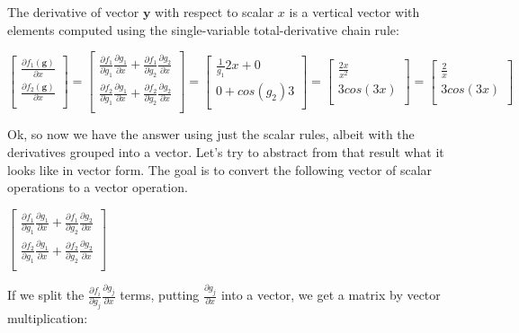 \documentclass[11pt]{article}
\begin{document}
The derivative of vector $\mathbf{y}$ with respect to scalar $x$ is a vertical vector with elements computed using the single-variable total-derivative chain rule:

$
\begin{bmatrix}
	\frac{\partial f_1(\mathbf{g})}{\partial x}\\
	\frac{\partial f_2(\mathbf{g})}{\partial x}\\
\end{bmatrix} = \begin{bmatrix}
	\frac{\partial f_1}{\partial g_1}\frac{\partial g_1}{\partial x} + \frac{\partial f_1}{\partial g_2}\frac{\partial g_2}{\partial x}\\
	\frac{\partial f_2}{\partial g_1}\frac{\partial g_1}{\partial x} + \frac{\partial f_2}{\partial g_2}\frac{\partial g_2}{\partial x}\\
\end{bmatrix} = \begin{bmatrix}
	\frac{1}{g_1}2x + 0\\
	0 + cos(g_2)3\\
\end{bmatrix} = \begin{bmatrix}
	\frac{2x}{x^2}\\
	3cos(3x)\\
\end{bmatrix} = \begin{bmatrix}
	\frac{2}{x}\\
	3cos(3x)\\
\end{bmatrix}
$

Ok, so now we have the answer using just the scalar rules, albeit with the derivatives grouped into a vector. Let's try to abstract from that result what it looks like in vector form.  The goal is to convert the following vector of scalar operations to a vector operation. 

$
\begin{bmatrix}
	\frac{\partial f_1}{\partial g_1}\frac{\partial g_1}{\partial x} + \frac{\partial f_1}{\partial g_2}\frac{\partial g_2}{\partial x}\\
	\frac{\partial f_2}{\partial g_1}\frac{\partial g_1}{\partial x} + \frac{\partial f_2}{\partial g_2}\frac{\partial g_2}{\partial x}\\
\end{bmatrix}
$

If we split the $\frac{\partial f_i}{\partial g_j}\frac{\partial g_j}{\partial x}$ terms, putting $\frac{\partial g_j}{\partial x}$ into a vector, we get a matrix by vector multiplication:
\end{document}
